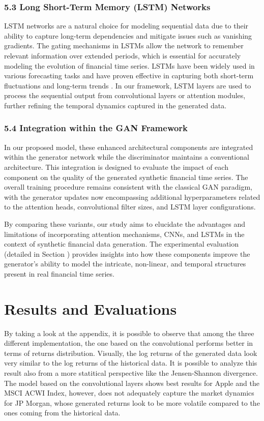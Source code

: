 \documentclass{article}
\begin{document}
\subsubsection*{5.3 Long Short-Term Memory (LSTM) Networks}

LSTM networks are a natural choice for modeling sequential data due to their ability to capture long-term dependencies and mitigate issues such as vanishing gradients. The gating mechanisms in LSTMs allow the network to remember relevant information over extended periods, which is essential for accurately modeling the evolution of financial time series. LSTMs have been widely used in various forecasting tasks and have proven effective in capturing both short-term fluctuations and long-term trends . In our framework, LSTM layers are used to process the sequential output from convolutional layers or attention modules, further refining the temporal dynamics captured in the generated data.

\subsubsection*{5.4 Integration within the GAN Framework}

In our proposed model, these enhanced architectural components are integrated within the generator network while the discriminator maintains a conventional architecture. This integration is designed to evaluate the impact of each component on the quality of the generated synthetic financial time series. The overall training procedure remains consistent with the classical GAN paradigm, with the generator updates now encompassing additional hyperparameters related to the attention heads, convolutional filter sizes, and LSTM layer configurations.

By comparing these variants, our study aims to elucidate the advantages and limitations of incorporating attention mechanisms, CNNs, and LSTMs in the context of synthetic financial data generation. The experimental evaluation (detailed in Section ) provides insights into how these components improve the generator's ability to model the intricate, non-linear, and temporal structures present in real financial time series.

\section{Results and Evaluations}

By taking a look at the appendix, it is possible to observe that among the three different implementation, the one based on the convolutional performs better in terms of returns distribution. Visually, the log returns of the generated data look very similar to the log returns of the historical data. It is possible to analyze this result also from a more statitical perspective like the Jensen-Shannon divergence. The model based on the convolutional layers shows best results for Apple and the MSCI ACWI Index, however, does not adequately capture the market dynamics for JP Morgan, whose generated returns look to be more volatile compared to the ones coming from the historical data.
\end{document}
